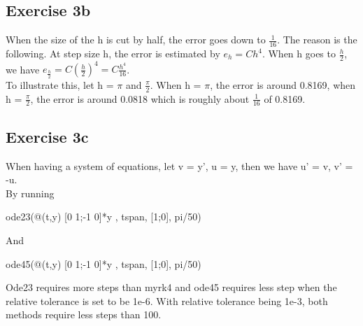 \documentclass[11pt]{article} %
\begin{document}
\subsection{Exercise 3b}
When the size of the h is cut by half, the error goes down to $\frac{1}{16}$. The reason is the following. At step size h, the error is estimated by $e_{h} = Ch^{4}$. When h goes to $\frac{h}{2}$, we have $e_{\frac{h}{2}} = C(\frac{h}{2})^{4} = C\frac{h^4}{16}$.\\
To illustrate this, let h = $\pi$ and $\frac{\pi}{2}$. When h = $\pi$, the error is around 0.8169, when h = $\frac{\pi}{2}$, the error is around 0.0818 which is roughly about $\frac{1}{16}$ of 0.8169.
\subsection{Exercise 3c}
When having a system of equations, let v = y', u = y, then we have u' = v, v' = -u.\\
By running \\
\centerline{ode23(@(t,y) [0 1;-1 0]*y , tspan, [1;0], pi/50)}
And\\
\centerline{ode45(@(t,y) [0 1;-1 0]*y , tspan, [1;0], pi/50)}
Ode23 requires more steps than myrk4 and ode45 requires less step when the relative tolerance is set to be 1e-6. With relative tolerance being 1e-3, both methods require less steps than 100.
\end{document}

